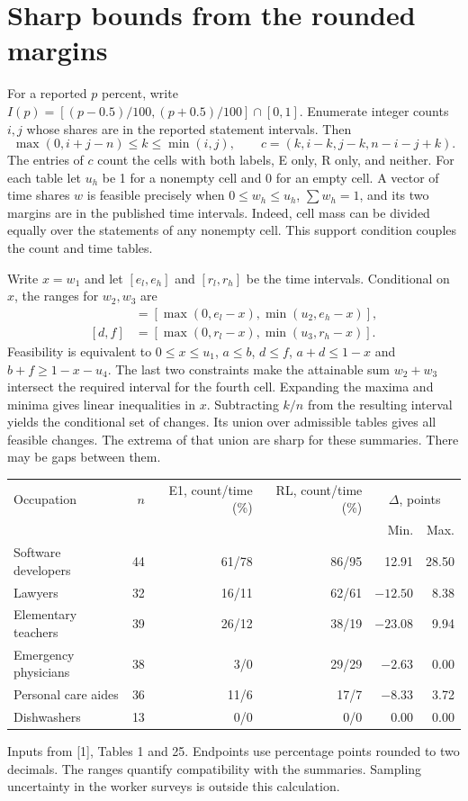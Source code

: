 \documentclass[11pt]{article}
\begin{document}
\section{Sharp bounds from the rounded margins}
For a reported $p$ percent, write $I(p)=[(p-0.5)/100,(p+0.5)/100]\cap[0,1]$. Enumerate integer counts $i,j$ whose shares are in the reported statement intervals. Then
\[
 \max(0,i+j-n)\le k\le\min(i,j),\qquad c=(k,i-k,j-k,n-i-j+k).
\]
The entries of $c$ count the cells with both labels, E only, R only, and neither. For each table let $u_h$ be 1 for a nonempty cell and 0 for an empty cell. A vector of time shares $w$ is feasible precisely when $0\le w_h\le u_h$, $\sum w_h=1$, and its two margins are in the published time intervals. Indeed, cell mass can be divided equally over the statements of any nonempty cell. This support condition couples the count and time tables.

Write $x=w_1$ and let $[e_l,e_h]$ and $[r_l,r_h]$ be the time intervals. Conditional on $x$, the ranges for $w_2,w_3$ are
\begin{align*}
[a,b]&=[\max(0,e_l-x),\min(u_2,e_h-x)],\\
[d,f]&=[\max(0,r_l-x),\min(u_3,r_h-x)].
\end{align*}
Feasibility is equivalent to $0\le x\le u_1$, $a\le b$, $d\le f$, $a+d\le1-x$ and $b+f\ge1-x-u_4$. The last two constraints make the attainable sum $w_2+w_3$ intersect the required interval for the fourth cell. Expanding the maxima and minima gives linear inequalities in $x$. Subtracting $k/n$ from the resulting interval yields the conditional set of changes. Its union over admissible tables gives all feasible changes. The extrema of that union are sharp for these summaries. There may be gaps between them.

\begin{center}\small
\begin{tabular}{lrrrrr}\toprule
Occupation & $n$ & E1, count/time (\%) & RL, count/time (\%) &\multicolumn{2}{c}{$\Delta$, points}\\
 & & & & Min. & Max.\\\midrule
Software developers &44&61/78&86/95&12.91&28.50\\
Lawyers &32&16/11&62/61&$-12.50$&8.38\\
Elementary teachers &39&26/12&38/19&$-23.08$&9.94\\
Emergency physicians &38&3/0&29/29&$-2.63$&0.00\\
Personal care aides &36&11/6&17/7&$-8.33$&3.72\\
Dishwashers &13&0/0&0/0&0.00&0.00\\\bottomrule
\end{tabular}\end{center}
\noindent Inputs from [1], Tables 1 and 25. Endpoints use percentage points rounded to two decimals. The ranges quantify compatibility with the summaries. Sampling uncertainty in the worker surveys is outside this calculation.
\end{document}
